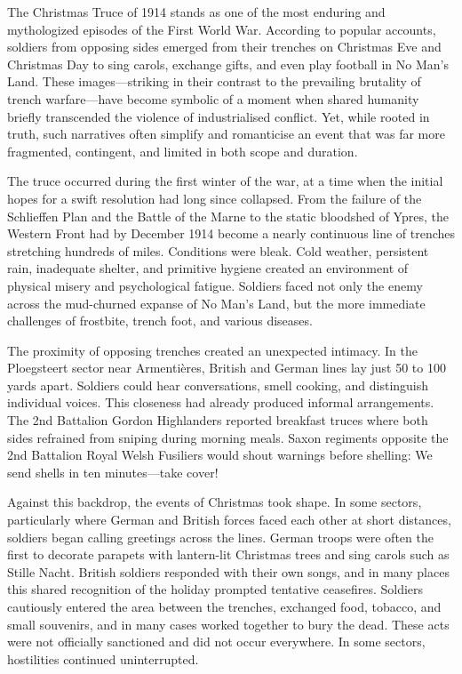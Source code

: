 The Christmas Truce of 1914 stands as one of the most enduring and mythologized episodes of the First World War. According to popular accounts, soldiers from opposing sides emerged from their trenches on Christmas Eve and Christmas Day to sing carols, exchange gifts, and even play football in No Man’s Land. These images—striking in their contrast to the prevailing brutality of trench warfare—have become symbolic of a moment when shared humanity briefly transcended the violence of industrialised conflict. Yet, while rooted in truth, such narratives often simplify and romanticise an event that was far more fragmented, contingent, and limited in both scope and duration.

The truce occurred during the first winter of the war, at a time when the initial hopes for a swift resolution had long since collapsed. From the failure of the Schlieffen Plan and the Battle of the Marne to the static bloodshed of Ypres, the Western Front had by December 1914 become a nearly continuous line of trenches stretching hundreds of miles. Conditions were bleak. Cold weather, persistent rain, inadequate shelter, and primitive hygiene created an environment of physical misery and psychological fatigue. Soldiers faced not only the enemy across the mud-churned expanse of No Man's Land, but the more immediate challenges of frostbite, trench foot, and various diseases.

The proximity of opposing trenches created an unexpected intimacy. In the Ploegsteert sector near Armentières, British and German lines lay just 50 to 100 yards apart. Soldiers could hear conversations, smell cooking, and distinguish individual voices. This closeness had already produced informal arrangements. The 2nd Battalion Gordon Highlanders reported \QSOpen{}breakfast truces\QSClose{} where both sides refrained from sniping during morning meals. Saxon regiments opposite the 2nd Battalion Royal Welsh Fusiliers would shout warnings before shelling: \QSOpen{}We send shells in ten minutes—take cover!\QSClose{}

Against this backdrop, the events of Christmas took shape. In some sectors, particularly where German and British forces faced each other at short distances, soldiers began calling greetings across the lines. German troops were often the first to decorate parapets with lantern-lit Christmas trees and sing carols such as \QENOpen{}Stille Nacht.\QENClose{} British soldiers responded with their own songs, and in many places this shared recognition of the holiday prompted tentative ceasefires. Soldiers cautiously entered the area between the trenches, exchanged food, tobacco, and small souvenirs, and in many cases worked together to bury the dead. These acts were not officially sanctioned and did not occur everywhere. In some sectors, hostilities continued uninterrupted.

